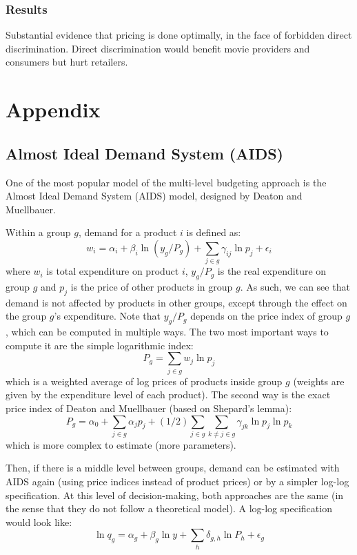 \subsubsection{Results}

Substantial evidence that pricing is done optimally, in the face of forbidden direct discrimination. Direct discrimination would benefit movie providers and consumers but hurt retailers. 

\section{Appendix}

\subsection{Almost Ideal Demand System (AIDS)}

One of the most popular model of the multi-level budgeting approach is the Almost Ideal Demand System (AIDS) model, designed by Deaton and Muellbauer.

Within a group $g$, demand for a product $i$ is defined as: $$ w_i = \alpha_i + \beta_i \ln(y_g/P_g) + \sum_{j\in g} \gamma_{ij} \ln p_j + \epsilon_i $$ where $w_i$ is total expenditure on product $i$, $y_g/P_g$ is the real expenditure on group $g$ and $p_j$ is the price of other products in group $g$. As such, we can see that demand is not affected by products in other groups, except through the effect on the group $g$'s expenditure. Note that $y_g/P_g$ depends on the price index of group $g$, which can be computed in multiple ways. The two most important ways to compute it are the simple logarithmic index: $$ P_g = \sum_{j\in g} w_j \ln p_j $$ which is a weighted average of log prices of products inside group $g$ (weights are given by the expenditure level of each product). The second way is the exact price index of Deaton and Muellbauer (based on Shepard's lemma): $$ P_g = \alpha_0 + \sum_{j\in g} \alpha_j p_j + (1/2) \sum_{j\in g}\sum_{k\neq j\in g} \gamma_{jk} \ln p_j \ln p_k $$ which is more complex to estimate (more parameters).

Then, if there is a middle level between groups, demand can be estimated with AIDS again (using price indices instead of product prices) or by a simpler log-log specification. At this level of decision-making, both approaches are the same (in the sense that they do not follow a theoretical model). A log-log specification would look like: $$ \ln q_g = \alpha_g + \beta_g \ln y + \sum_{h} \delta_{g,h } \ln P_h + \epsilon_g $$


